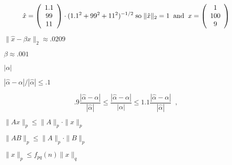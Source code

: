 {\newpage\clearpage
{}%
\begin{displaymath}
\hat{x} = \left( \begin{array}{c} 1.1 \\99 \\11 \end{array} \right) \cdot (1.1^2 + 99^2 + 11^2)^{-1/2}
\; {\rm so} \; \| \hat{x} \|_2 = 1
\; \; {\rm and} \; \;
x = \left( \begin{array}{c} 1 \\100 \\9 \end{array} \right) 
\end{displaymath}%
\lthtmldisplayZ
\lthtmlcheckvsize\clearpage}

{\newpage\clearpage
{}%
$\| \hat{x} - \beta x \|_2 \approx .0209$%
\lthtmlinlinemathZ
\lthtmlcheckvsize\clearpage}

{\newpage\clearpage
{}%
$\beta \approx .001$%
\lthtmlinlinemathZ
\lthtmlcheckvsize\clearpage}

{\newpage\clearpage
{}%
$| \alpha |$%
\lthtmlinlinemathZ
\lthtmlcheckvsize\clearpage}

{\newpage\clearpage
{}%
$| \hat{\alpha} - \alpha | / | \hat{\alpha} | \leq .1$%
\lthtmlinlinemathZ
\lthtmlcheckvsize\clearpage}

{\newpage\clearpage
{}%
\begin{displaymath}
.9 \frac{| \hat{\alpha} - \alpha |}{| \hat{\alpha} |} \leq
\frac{| \hat{\alpha} - \alpha |}{| {\alpha} |} \leq
1.1 \frac{| \hat{\alpha} - \alpha |}{| \hat{\alpha} |} \; \; ,
\end{displaymath}%
\lthtmldisplayZ
\lthtmlcheckvsize\clearpage}

{\newpage\clearpage
{}%
$\|Ax\|_p \leq \|A\|_p \cdot \|x\|_p$%
\lthtmlinlinemathZ
\lthtmlcheckvsize\clearpage}

{\newpage\clearpage
{}%
$\|AB\|_p \leq \|A\|_p \cdot \|B\|_p$%
\lthtmlinlinemathZ
\lthtmlcheckvsize\clearpage}

{\newpage\clearpage
{}%
$\| x \|_p \leq f_{pq}(n) \|x \|_q$%
\lthtmlinlinemathZ
\lthtmlcheckvsize\clearpage}

